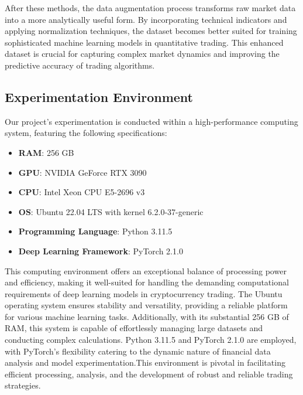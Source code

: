 \documentclass[10pt,twocolumn,letterpaper]{article}
\begin{document}
After these methods, the data augmentation process transforms raw market data into a more analytically useful form. By incorporating technical indicators and applying normalization techniques, the dataset becomes better suited for training sophisticated machine learning models in quantitative trading. This enhanced dataset is crucial for capturing complex market dynamics and improving the predictive accuracy of trading algorithms.

\subsection{Experimentation Environment}

Our project's experimentation is conducted within a high-performance computing system, featuring the following specifications:

\begin{itemize}
   \item \textbf{RAM}: 256 GB
   \item \textbf{GPU}: NVIDIA GeForce RTX 3090
   \item \textbf{CPU}: Intel Xeon CPU E5-2696 v3
   \item \textbf{OS}: Ubuntu 22.04 LTS with kernel 6.2.0-37-generic
   \item \textbf{Programming Language}: Python 3.11.5
   \item \textbf{Deep Learning Framework}: PyTorch 2.1.0
\end{itemize}

This computing environment offers an exceptional balance of processing power and efficiency, making it well-suited for handling the demanding computational requirements of deep learning models in cryptocurrency trading. The Ubuntu operating system ensures stability and versatility, providing a reliable platform for various machine learning tasks. Additionally, with its substantial 256 GB of RAM, this system is capable of effortlessly managing large datasets and conducting complex calculations. Python 3.11.5 and PyTorch 2.1.0 are employed, with PyTorch's flexibility catering to the dynamic nature of financial data analysis and model experimentation.This environment is pivotal in facilitating efficient processing, analysis, and the development of robust and reliable trading strategies.
\end{document}
